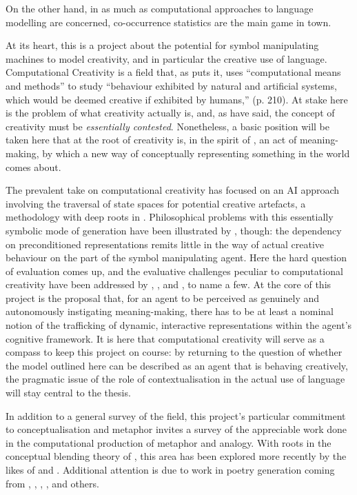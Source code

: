 On the other hand, in as much as computational approaches to language modelling are concerned, co-occurrence statistics are the main game in town.


At its heart, this is a project about the potential for symbol manipulating machines to model creativity, and in particular the creative use of language.  Computational Creativity is a field that, as \cite{Wiggins2006b} puts it, uses ``computational means and methods'' to study ``behaviour exhibited by natural and artificial systems, which would be deemed creative if exhibited by humans,'' (p. 210).  At stake here is the problem of what creativity actually is, and, as \cite{Colton} have said, the concept of creativity must be \emph{essentially contested}.  Nonetheless, a basic position will be taken here that at the root of creativity is, in the spirit of \cite{Wittgenstein1953}, an act of meaning-making, by which a new way of conceptually representing something in the world comes about.

The prevalent take on computational creativity has focused on an AI approach involving the traversal of state spaces for potential creative artefacts, a methodology with deep roots in \cite{Boden1990}.  Philosophical problems with this essentially symbolic mode of generation have been illustrated by \cite{McGregorEA2014}, though: the dependency on preconditioned representations remits little in the way of actual creative behaviour on the part of the symbol manipulating agent.  Here the hard question of evaluation comes up, and the evaluative challenges peculiar to computational creativity have been addressed by \cite{Ritchie2007}, \cite{ColtonEA2012B}, and \cite{Jordanous2012}, to name a few.  At the core of this project is the proposal that, for an agent to be perceived as genuinely and autonomously instigating meaning-making, there has to be at least a nominal notion of the trafficking of dynamic, interactive representations within the agent's cognitive framework.  It is here that computational creativity will serve as a compass to keep this project on course: by returning to the question of whether the model outlined here can be described as an agent that is behaving creatively, the pragmatic issue of the role of contextualisation in the actual use of language will stay central to the thesis.

In addition to a general survey of the field, this project's particular commitment to conceptualisation and metaphor invites a survey of the appreciable work done in the computational production of metaphor and analogy.  With roots in the conceptual blending theory of \cite{Turner}, this area has been explored more recently by the likes of \cite{VealeEA2007} and \cite{O'Donoghue}.  Additional attention is due to work in poetry generation coming from \cite{Gervas}, \cite{Toivonen}, \cite{Rashel}, \cite{Cardosa}, and others.

